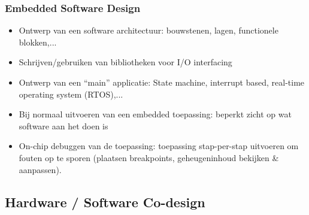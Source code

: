 \documentclass{beamer}
\begin{document}
\begin{frame} 
\frametitle{Embedded Software Design}
\begin{itemize}[<+->]
  \item Ontwerp van een software architectuur: bouwstenen, lagen, functionele blokken,...
  \item Schrijven/gebruiken van bibliotheken voor I/O interfacing
  \item Ontwerp van een ``main'' applicatie: State machine, interrupt based, real-time operating system (RTOS),...
  \item Bij normaal uitvoeren van een embedded toepassing: beperkt zicht op wat software aan het doen is
  \item On-chip debuggen van de toepassing: toepassing stap-per-stap uitvoeren om fouten op te sporen (plaatsen breakpoints, geheugeninhoud bekijken \& aanpassen).
\end{itemize}
\end{frame}

\subsection{Hardware / Software Co-design}
\end{document}
